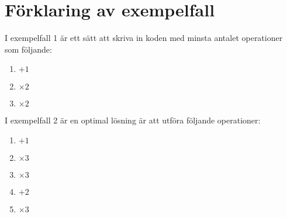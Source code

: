 \section*{Förklaring av exempelfall}
I exempelfall 1 är ett sätt att skriva in koden med minsta antalet operationer som följande:
\begin{enumerate}
  \item $+1$
  \item $\times 2$
  \item $\times 2$
\end{enumerate}


I exempelfall 2 är en optimal lösning är att utföra följande operationer:
\begin{enumerate}
  \item $+1$
  \item $\times 3$
  \item $\times 3$
  \item $+2$
  \item $\times 3$
\end{enumerate}
